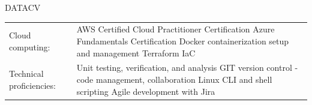 \documentclass[letterpaper]{article}
\newenvironment{skillslist}
        {
            \hspace*{-0.07in}\begin{tabular}[t]{ l L{5.17in} }
        }{
            \end{tabular}
        }
\newcommand{\impt}[1]{\uline{#1}}
\begin{document}
\begin{taggedblock}{DATACV}
\begin{skillslist}
            Cloud computing:&
                AWS Certified Cloud Practitioner Certification \linebreak
                Azure Fundamentals Certification \linebreak
                Docker containerization setup and management \linebreak
                Terraform IaC \linebreak
                \\
            Technical proficiencies:&
                Unit testing, verification, and analysis\linebreak
                GIT version control - code management, collaboration \linebreak
                Linux CLI and shell scripting \linebreak
                Agile development with Jira \linebreak
                \\
        \end{skillslist}
    \end{taggedblock}
\end{document}
